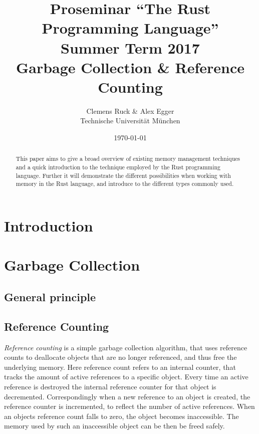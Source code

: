 \documentclass[twocolumn]{article}
\author{Clemens Ruck \& Alex Egger\\ Technische Universit\"at M\"unchen}
\title{Proseminar ``The Rust Programming Language'' \\
       Summer Term 2017 \\
       {\bf Garbage Collection \& Reference Counting}
}
\date{\today}
\begin{document}
\maketitle

\begin{abstract}
This paper aims to give a broad overview of existing memory management techniques
and a quick introduction to the technique employed by the Rust programming language.
Further it will demonstrate the different possibilities when working with memory in
the Rust language, and introduce to the different types commonly used.
\end{abstract}

\section{Introduction}

\label{introduction}
\section{Garbage Collection}
\subsection{General principle}
\subsection{Reference Counting}
\textit{Reference counting} is a simple garbage collection algorithm, that uses reference counts to deallocate objects that are no longer referenced, and thus free the underlying memory.
Here reference count refers to an internal counter, that tracks the amount of active references to a specific object.
Every time an active reference is destroyed the internal reference counter for that object is decremented.
Correspondingly when a new reference to an object is created, the reference counter is incremented, to reflect the number of active references.
When an objects reference count falls to zero, the object becomes inaccessible.
The memory used by such an inaccessible object can be then be freed safely.
\end{document}
